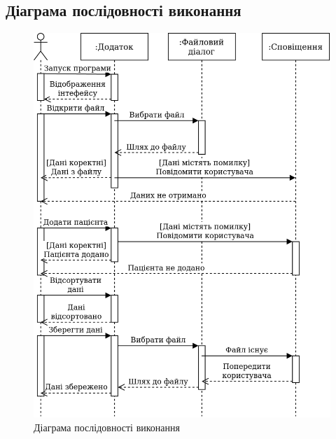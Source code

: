 \documentclass[oneside,14pt]{extarticle}
\begin{document}
\subsection{Діаграма послідовності виконання}
\begin{figure}[H]
	\centering
	\includegraphics[scale=0.5]{3}
	\caption{Діаграма послідовності виконання}
\end{figure}
\end{document}
